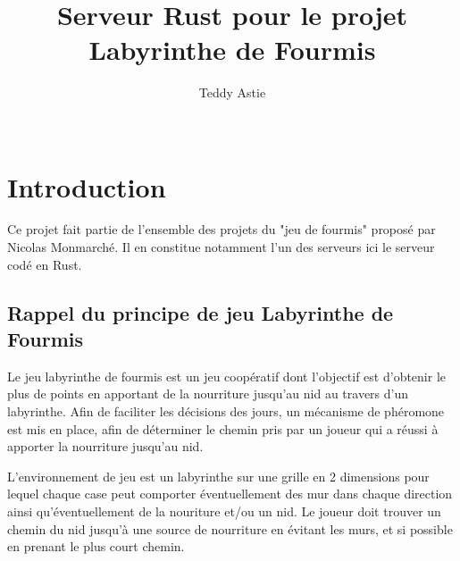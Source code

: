 \documentclass{EPUProjetDi}
\title[Projet FourmiLaby Rust]{Serveur Rust pour le projet Labyrinthe de Fourmis}
\author{Teddy Astie\\ %
\noindent[\url{teddy.astie@etu.univ-tours.fr}]\\
}
\begin{document}
\maketitle

\setcounter{page}{0}

{
\setlength{\parskip}{0em}

\tableofcontents


}


\start

\chapter*{Introduction}

Ce projet fait partie de l'ensemble des projets du "jeu de fourmis" proposé par Nicolas Monmarché. Il en constitue notamment l'un des serveurs ici le serveur codé en Rust.

\section{Rappel du principe de jeu Labyrinthe de Fourmis}

Le jeu labyrinthe de fourmis est un jeu coopératif dont l'objectif est d'obtenir le plus de points en apportant de la nourriture jusqu'au nid au travers d'un labyrinthe. Afin de faciliter les décisions des jours, un mécanisme de phéromone est mis en place, afin de déterminer le chemin pris par un joueur qui a réussi à apporter la nourriture jusqu'au nid.

L'environnement de jeu est un labyrinthe sur une grille en 2 dimensions pour lequel chaque case peut comporter éventuellement des mur dans chaque direction ainsi qu'éventuellement de la nouriture et/ou un nid. Le joueur doit trouver un chemin du nid jusqu'à une source de nourriture en évitant les murs, et si possible en prenant le plus court chemin.
\end{document}
